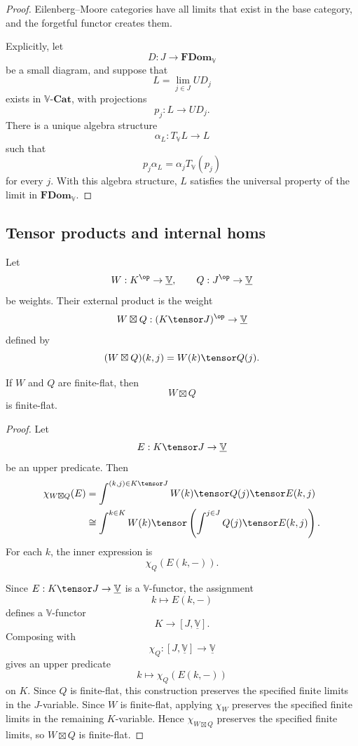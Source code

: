 \begin{proof}
Eilenberg--Moore categories have all limits that exist in the base category, and
the forgetful functor creates them.

Explicitly, let
\[
    D:J\to\mathbf{FDom}_{\mathbb V}
\]
be a small diagram, and suppose that
\[
    L=\lim_{j\in J}UD_j
\]
exists in \(\mathbb V\text{-}\mathbf{Cat}\), with projections
\[
    p_j:L\to UD_j.
\]
There is a unique algebra structure
\[
    \alpha_L:T_{\mathbb V}L\to L
\]
such that
\[
    p_j\alpha_L=\alpha_jT_{\mathbb V}(p_j)
\]
for every \(j\).  With this algebra structure, \(L\) satisfies the universal
property of the limit in \(\mathbf{FDom}_{\mathbb V}\).
\end{proof}

\subsection{Tensor products and internal homs}
\label{subsec:tensor-products-internal-homs-fdom}

\begin{definition}
\label{def:external-product-weights-fdom}
Let
\[
    W:K^{\op}\to\underline{\mathbb V},
    \qquad
    Q:J^{\op}\to\underline{\mathbb V}
\]
be weights.  Their external product is the weight
\[
    W\boxtimes Q:(K\tensor J)^{\op}\to\underline{\mathbb V}
\]
defined by
\[
    (W\boxtimes Q)(k,j)=W(k)\tensor Q(j).
\]
\end{definition}

\begin{proposition}
\label{prop:external-products-finite-flat-fdom}
If \(W\) and \(Q\) are finite-flat, then
\[
    W\boxtimes Q
\]
is finite-flat.
\end{proposition}

\begin{proof}
Let
\[
    E:K\tensor J\to\underline{\mathbb V}
\]
be an upper predicate.  Then
\[
\begin{aligned}
    \chi_{W\boxtimes Q}(E)
    &=
    \int^{(k,j)\in K\tensor J}
        W(k)\tensor Q(j)\tensor E(k,j)
    \\
    &\cong
    \int^{k\in K}
        W(k)\tensor
        \left(
            \int^{j\in J}Q(j)\tensor E(k,j)
        \right).
\end{aligned}
\]
For each \(k\), the inner expression is
\[
    \chi_Q(E(k,-)).
\]

Since \(E:K\tensor J\to\underline{\mathbb V}\) is a \(\mathbb V\)-functor, the
assignment
\[
    k\longmapsto E(k,-)
\]
defines a \(\mathbb V\)-functor
\[
    K\to[J,\underline{\mathbb V}].
\]
Composing with
\[
    \chi_Q:[J,\underline{\mathbb V}]\to\underline{\mathbb V}
\]
gives an upper predicate
\[
    k\longmapsto \chi_Q(E(k,-))
\]
on \(K\).  Since \(Q\) is finite-flat, this construction preserves the specified
finite limits in the \(J\)-variable.  Since \(W\) is finite-flat, applying
\(\chi_W\) preserves the specified finite limits in the remaining \(K\)-variable.
Hence \(\chi_{W\boxtimes Q}\) preserves the specified finite limits, so
\(W\boxtimes Q\) is finite-flat.
\end{proof}

